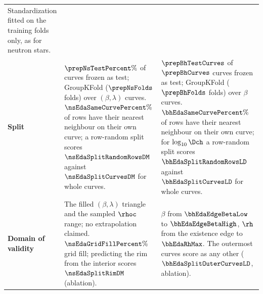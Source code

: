 \begin{table}[!htb]
\begin{tabular}{p{2.6cm} p{4.5cm} p{4.5cm}}
Standardization fitted on the training folds only, as for neutron stars. \\
\textbf{Split} &
$\prepNsTestPercent\%$ of curves frozen as test; GroupKFold ($\prepNsFolds$ folds) over $(\beta, \lambda)$ curves. $\nsEdaSameCurvePercent\%$ of rows have their nearest neighbour on their own curve; a row-random split scores $\nsEdaSplitRandomRowsDM$ against $\nsEdaSplitCurvesDM$ for whole curves. &
$\prepBhTestCurves$ of $\prepBhCurves$ curves frozen as test; GroupKFold ($\prepBhFolds$ folds) over $\beta$ curves. $\bhEdaSameCurvePercent\%$ of rows have their nearest neighbour on their own curve; for $\log_{10}\Dch$ a row-random split scores $\bhEdaSplitRandomRowsLD$ against $\bhEdaSplitCurvesLD$ for whole curves. \\
\textbf{Domain of validity} &
The filled $(\beta, \lambda)$ triangle and the sampled $\rhoc$ range; no extrapolation claimed. $\nsEdaGridFillPercent\%$ grid fill; predicting the rim from the interior scores $\nsEdaSplitRimDM$ (ablation). &
$\beta$ from $\bhEdaEdgeBetaLow$ to $\bhEdaEdgeBetaHigh$, $\rh$ from the existence edge to $\bhEdaRhMax$. The outermost curves score as any other ($\bhEdaSplitOuterCurvesLD$, ablation). \\
\bottomrule
\end{tabular}
\end{table}
